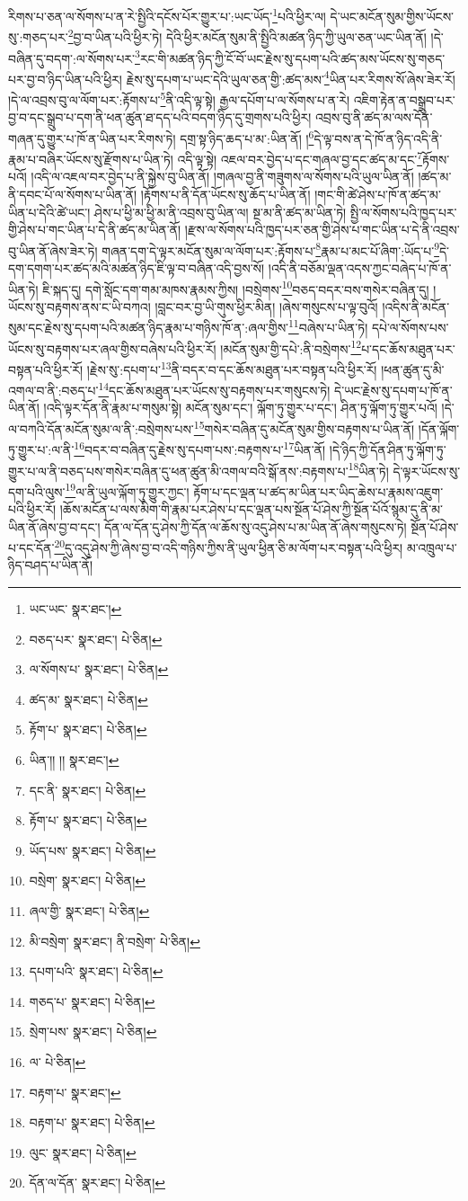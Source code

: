 རིགས་པ་ཅན་ལ་སོགས་པ་ན་རེ་སྤྱིའི་དངོས་པོར་གྱུར་པ་:ཡང་ཡོད་\footnote{ཡང་ཡང་  སྣར་ཐང་། }པའི་ཕྱིར་ལ། དེ་ཡང་མངོན་སུམ་གྱིས་ཡོངས་སུ་:གཅད་པར་\footnote{བཅད་པར་  སྣར་ཐང་།  པེ་ཅིན། }བྱ་བ་ཡིན་པའི་ཕྱིར་ཏེ། དེའི་ཕྱིར་མངོན་སུམ་ནི་སྤྱིའི་མཚན་ཉིད་ཀྱི་ཡུལ་ཅན་ཡང་ཡིན་ནོ། །དེ་བཞིན་དུ་བདག་:ལ་སོགས་པར་\footnote{ལ་སོགས་པ་  སྣར་ཐང་།  པེ་ཅིན། }རང་གི་མཚན་ཉིད་ཀྱི་ངོ་བོ་ཡང་རྗེས་སུ་དཔག་པའི་ཚད་མས་ཡོངས་སུ་གཅད་པར་བྱ་བ་ཉིད་ཡིན་པའི་ཕྱིར། རྗེས་སུ་དཔག་པ་ཡང་དེའི་ཡུལ་ཅན་གྱི་:ཚད་མས་\footnote{ཚད་མ་  སྣར་ཐང་།  པེ་ཅིན། }ཡིན་པར་རིགས་སོ་ཞེས་ཟེར་རོ། །དེ་ལ་འབྲས་བུ་ལ་ལོག་པར་:རྟོགས་པ་\footnote{རྟོག་པ་  སྣར་ཐང་།  པེ་ཅིན། }ནི་འདི་ལྟ་སྟེ། རྒྱལ་དཔོག་པ་ལ་སོགས་པ་ན་རེ། འཇིག་རྟེན་ན་བསྒྲུབ་པར་བྱ་བ་དང་སྒྲུབ་པ་དག་ནི་ཕན་ཚུན་ཐ་དད་པའི་བདག་ཉིད་དུ་གྲགས་པའི་ཕྱིར། འབྲས་བུ་ནི་ཚད་མ་ལས་དོན་གཞན་དུ་གྱུར་པ་ཁོ་ན་ཡིན་པར་རིགས་ཏེ། དགྲ་སྟ་ཉིད་ཆད་པ་མ་:ཡིན་ནོ། །\footnote{ཡིན་།། །།  སྣར་ཐང་། }དེ་ལྟ་བས་ན་དེ་ཁོ་ན་ཉིད་འདི་ནི་རྣམ་པ་བཞིར་ཡོངས་སུ་རྫོགས་པ་ཡིན་ཏེ། འདི་ལྟ་སྟེ། འཇལ་བར་བྱེད་པ་དང་གཞལ་བྱ་དང་ཚད་མ་དང་\footnote{དང་ནི་  སྣར་ཐང་།  པེ་ཅིན། }རྟོགས་པའོ། །འདི་ལ་འཇལ་བར་བྱེད་པ་ནི་སྐྱེས་བུ་ཡིན་ནོ། །གཞལ་བྱ་ནི་གཟུགས་ལ་སོགས་པའི་ཡུལ་ཡིན་ནོ། །ཚད་མ་ནི་དབང་པོ་ལ་སོགས་པ་ཡིན་ནོ། །རྟོགས་པ་ནི་དོན་ཡོངས་སུ་ཆོད་པ་ཡིན་ནོ། །གང་གི་ཚེ་ཤེས་པ་ཁོ་ན་ཚད་མ་ཡིན་པ་དེའི་ཚེ་ཡང་། ཤེས་པ་ཕྱི་མ་ཕྱི་མ་ནི་འབྲས་བུ་ཡིན་ལ། སྔ་མ་ནི་ཚད་མ་ཡིན་ཏེ། སྤྱི་ལ་སོགས་པའི་ཁྱད་པར་གྱི་ཤེས་པ་གང་ཡིན་པ་དེ་ནི་ཚད་མ་ཡིན་ནོ། །རྫས་ལ་སོགས་པའི་ཁྱད་པར་ཅན་གྱི་ཤེས་པ་གང་ཡིན་པ་དེ་ནི་འབྲས་བུ་ཡིན་ནོ་ཞེས་ཟེར་ཏེ། གཞན་དག་དེ་ལྟར་མངོན་སུམ་ལ་ལོག་པར་:རྟོགས་པ་\footnote{རྟོག་པ་  སྣར་ཐང་།  པེ་ཅིན། }རྣམ་པ་མང་པོ་ཞིག་:ཡོད་པ་\footnote{ཡོད་པས་  སྣར་ཐང་།  པེ་ཅིན། }དེ་དག་དགག་པར་ཚད་མའི་མཚན་ཉིད་ཇི་ལྟ་བ་བཞིན་འདི་བྱས་སོ། །འདི་ནི་བཅོམ་ལྡན་འདས་ཀྱང་བཞེད་པ་ཁོ་ན་ཡིན་ཏེ། ཇི་སྐད་དུ། དགེ་སློང་དག་གམ་མཁས་རྣམས་ཀྱིས། །བསྲེགས་\footnote{བསྲེག་  སྣར་ཐང་།  པེ་ཅིན། }བཅད་བདར་བས་གསེར་བཞིན་དུ། །ཡོངས་སུ་བརྟགས་ནས་ང་ཡི་བཀའ། །བླང་བར་བྱ་ཡི་གུས་ཕྱིར་མིན། །ཞེས་གསུངས་པ་ལྟ་བུའོ། །འདིས་ནི་མངོན་སུམ་དང་རྗེས་སུ་དཔག་པའི་མཚན་ཉིད་རྣམ་པ་གཉིས་ཁོ་ན་:ཞལ་གྱིས་\footnote{ཞལ་གྱི་  སྣར་ཐང་།  པེ་ཅིན། }བཞེས་པ་ཡིན་ཏེ། དཔེ་ལ་སོགས་པས་ཡོངས་སུ་བརྟགས་པར་ཞལ་གྱིས་བཞེས་པའི་ཕྱིར་རོ། །མངོན་སུམ་གྱི་དཔེ་:ནི་བསྲེགས་\footnote{མི་བསྲེག་  སྣར་ཐང་། ནི་བསྲེག་  པེ་ཅིན། }པ་དང་ཆོས་མཐུན་པར་བསྟན་པའི་ཕྱིར་རོ། །རྗེས་སུ་:དཔག་པ་\footnote{དཔག་པའི་  སྣར་ཐང་།  པེ་ཅིན། }ནི་བདར་བ་དང་ཆོས་མཐུན་པར་བསྟན་པའི་ཕྱིར་རོ། །ཕན་ཚུན་དུ་མི་འགལ་བ་ནི་:བཅད་པ་\footnote{གཅད་པ་  སྣར་ཐང་།  པེ་ཅིན། }དང་ཆོས་མཐུན་པར་ཡོངས་སུ་བརྟགས་པར་གསུངས་ཏེ། དེ་ཡང་རྗེས་སུ་དཔག་པ་ཁོ་ན་ཡིན་ནོ། །འདི་ལྟར་དོན་ནི་རྣམ་པ་གསུམ་སྟེ། མངོན་སུམ་དང་། ལྐོག་ཏུ་གྱུར་པ་དང་། ཤིན་ཏུ་ལྐོག་ཏུ་གྱུར་པའོ། །དེ་ལ་བཀའི་དོན་མངོན་སུམ་ལ་ནི་:བསྲེགས་པས་\footnote{སྲེག་པས་  སྣར་ཐང་།  པེ་ཅིན། }གསེར་བཞིན་དུ་མངོན་སུམ་གྱིས་བརྟགས་པ་ཡིན་ནོ། །དོན་ལྐོག་ཏུ་གྱུར་པ་:ལ་ནི་\footnote{ལ་  པེ་ཅིན། }བདར་བ་བཞིན་དུ་རྗེས་སུ་དཔག་པས་:བརྟགས་པ་\footnote{བརྟག་པ་  སྣར་ཐང་། }ཡིན་ནོ། །དེ་ཉིད་ཀྱི་དོན་ཤིན་ཏུ་ལྐོག་ཏུ་གྱུར་པ་ལ་ནི་བཅད་པས་གསེར་བཞིན་དུ་ཕན་ཚུན་མི་འགལ་བའི་སྒོ་ནས་:བརྟགས་པ་\footnote{བརྟག་པ་  སྣར་ཐང་།  པེ་ཅིན། }ཡིན་ཏེ། དེ་ལྟར་ཡོངས་སུ་དག་པའི་ལུས་\footnote{ལུང་  སྣར་ཐང་།  པེ་ཅིན། }ལ་ནི་ཡུལ་ལྐོག་ཏུ་གྱུར་ཀྱང་། རྟོག་པ་དང་ལྡན་པ་ཚད་མ་ཡིན་པར་ཡིད་ཆེས་པ་རྣམས་འཇུག་པའི་ཕྱིར་རོ། །ཆོས་མངོན་པ་ལས་མིག་གི་རྣམ་པར་ཤེས་པ་དང་ལྡན་པས་སྔོན་པོ་ཤེས་ཀྱི་སྔོན་པོའོ་སྙམ་དུ་ནི་མ་ཡིན་ནོ་ཞེས་བྱ་བ་དང་། དོན་ལ་དོན་དུ་ཤེས་ཀྱི་དོན་ལ་ཆོས་སུ་འདུ་ཤེས་པ་མ་ཡིན་ནོ་ཞེས་གསུངས་ཏེ། སྔོན་པོ་ཤེས་པ་དང་དོན་\footnote{དོན་ལ་དོན་  སྣར་ཐང་།  པེ་ཅིན། }དུ་འདུ་ཤེས་ཀྱི་ཞེས་བྱ་བ་འདི་གཉིས་ཀྱིས་ནི་ཡུལ་ཕྱིན་ཅི་མ་ལོག་པར་བསྟན་པའི་ཕྱིར། མ་འཁྲུལ་པ་ཉིད་བཤད་པ་ཡིན་ནོ། 